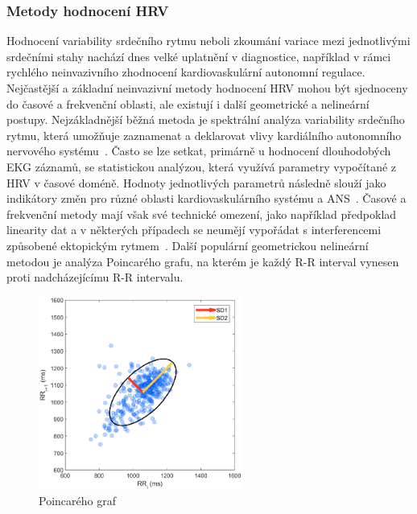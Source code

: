 \subsubsection{Metody hodnocení HRV}
\label{section:hrv_methods}
Hodnocení variability srdečního rytmu neboli zkoumání variace mezi jednotlivými
srdečními stahy nachází dnes velké uplatnění v diagnostice, například v rámci
rychlého neinvazivního zhodnocení kardiovaskulární autonomní regulace.
Nejčastější a základní neinvazivní metody hodnocení HRV mohou být sjednoceny do
časové a frekvenční oblasti, ale existují i další geometrické a nelineární
postupy. Nejzákladnější běžná metoda je spektrální analýza variability srdečního
rytmu, která umožňuje zaznamenat a deklarovat vlivy kardiálního autonomního
nervového systému~\cite{Pumprla2014}. Často se lze setkat, primárně u hodnocení
dlouhodobých EKG záznamů, se statistickou analýzou, která využívá parametry
vypočítané z HRV v časové doméně. Hodnoty jednotlivých parametrů následně slouží
jako indikátory změn pro různé oblasti kardiovaskulárního systému a
ANS~\cite{Malik1996}. Časové a frekvenční metody mají však své technické omezení, 
jako například předpoklad linearity dat a v některých případech se neumějí
vypořádat s interferencemi způsobené ektopickým rytmem~\cite{Hsu2012}. Další
populární geometrickou nelineární metodou je analýza Poincarého grafu, na kterém
je každý R-R interval vynesen proti nadcházejícímu R-R intervalu. 

\begin{figure}[h]
	\begin{center}
		\includegraphics[width=0.6\textwidth]{assets/figures/my_poincare}
		\caption{Poincarého graf}
		\label{fig:wiki_poincare}
	\end{center}
\end{figure}

